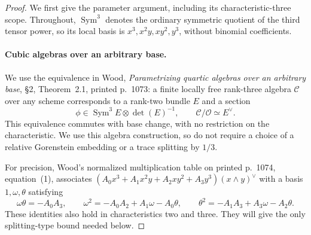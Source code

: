 \begin{proof}
We first give the parameter argument, including its
characteristic-three scope. Throughout, $\operatorname{Sym}^3$
denotes the ordinary symmetric quotient of the third
tensor power, so its local basis is $x^3,x^2y,xy^2,y^3$,
without binomial coefficients.

\paragraph{Cubic algebras over an arbitrary base.}
We use the equivalence in Wood, \emph{Parametrizing quartic
algebras over an arbitrary base}, \S2, Theorem~2.1,
printed p.~1073: a finite locally free rank-three algebra
$\mathcal C$ over any scheme corresponds to a rank-two
bundle $E$ and a section
\[
       \phi\in\operatorname{Sym}^3E\otimes\det(E)^{-1},
                  \qquad \mathcal C/\mathcal O\simeq E^\vee.
                                                               \tag{H9.136}
\]
This equivalence commutes with base change, with no
restriction on the characteristic. We use this algebra
construction, so do not require a choice of a relative
Gorenstein embedding or a trace splitting by $1/3$.

For precision, Wood's normalized multiplication table
on printed p.~1074, equation~(1), associates
$(A_0x^3+A_1x^2y+A_2xy^2+A_3y^3)(x\wedge y)^\vee$
with a basis $1,\omega,\theta$ satisfying
\[
 \omega\theta=-A_0A_3,\qquad
 \omega^2=-A_0A_2+A_1\omega-A_0\theta,\qquad
 \theta^2=-A_1A_3+A_3\omega-A_2\theta.
                                                               \tag{H9.137}
\]
These identities also hold in characteristics two and
three. They will give the only splitting-type bound
needed below.


\end{proof}
